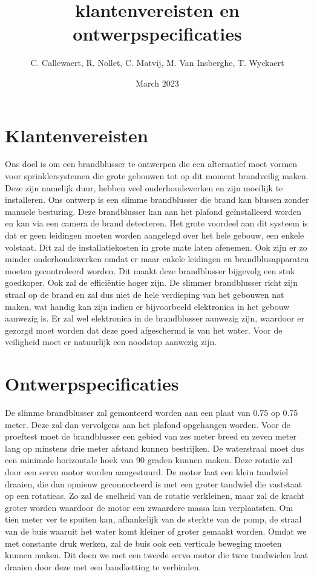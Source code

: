 \documentclass{kulakarticle}
\title{klantenvereisten en ontwerpspecificaties}
\author{C. Callewaert, R. Nollet, C. Matvij, M. Van Insberghe, T. Wyckaert }
\date{March 2023}
\begin{document}
\maketitle

\section{Klantenvereisten}

Ons doel is om een brandblusser te ontwerpen die een alternatief moet vormen voor sprinklersystemen die grote gebouwen tot op dit moment brandveilig maken. Deze zijn namelijk duur, hebben veel onderhoudswerken en zijn moeilijk te installeren. Ons ontwerp is een slimme brandblusser die brand kan blussen zonder manuele besturing. Deze brandblusser kan aan het plafond geïnstalleerd worden en kan via een camera  de brand  detecteren. Het grote voordeel aan dit systeem  is dat er geen leidingen moeten worden aangelegd over het hele gebouw, een enkele volstaat. Dit zal de installatiekosten in grote mate laten afenemen. Ook zijn er zo minder onderhoudswerken omdat er maar  enkele leidingen en brandblusapparaten moeten gecontroleerd worden. Dit maakt deze brandblusser bijgevolg een stuk goedkoper. Ook zal de efficiëntie hoger zijn. De slimmer brandblusser richt zijn straal op de brand en zal dus niet de hele verdieping van het gebouwen nat maken, wat handig kan zijn indien er  bijvoorbeeld elektronica in het gebouw aanwezig is. Er zal wel elektronica in de brandblusser aanwezig zijn, waardoor er gezorgd moet worden dat deze goed afgeschermd is van het water. Voor de veiligheid moet er natuurlijk een noodstop aanwezig zijn.


\section{Ontwerpspecificaties}

De slimme brandblusser zal gemonteerd worden aan een plaat van 0.75 op 0.75 meter. Deze zal dan vervolgens aan het plafond opgehangen worden. Voor de proeftest moet de brandblusser een gebied van zes meter breed en zeven meter lang op minstens drie meter afstand kunnen bestrijken. De waterstraal moet dus een minimale horizontale  hoek van 90 graden kunnen maken. Deze rotatie zal door een servo motor worden aangestuurd. De motor laat een klein tandwiel draaien, die dan opnieuw geconnecteerd is met een groter tandwiel die vaststaat op een rotatieas. Zo zal de snelheid van de rotatie verkleinen, maar zal de kracht groter worden waardoor de motor een zwaardere massa kan verplaatsten.  
Om tien meter  ver te spuiten kan, afhankelijk van de sterkte van de pomp, de straal van de buis waaruit het water komt kleiner of groter gemaakt worden. Omdat we met constante druk werken, zal de buis ook een verticale beweging moeten kunnen maken. Dit doen we met een tweede servo motor die twee tandwielen laat draaien door deze met een bandketting te verbinden. 
 
\end{document}
